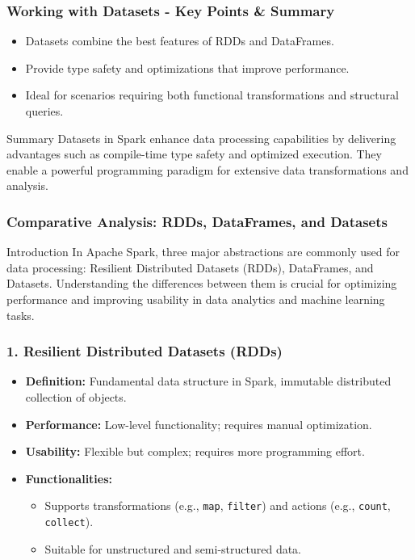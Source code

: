 \documentclass[aspectratio=169]{beamer}
\begin{document}
\begin{frame}[fragile]
    \frametitle{Working with Datasets - Key Points & Summary}
    \begin{itemize}
        \item Datasets combine the best features of RDDs and DataFrames.
        \item Provide type safety and optimizations that improve performance.
        \item Ideal for scenarios requiring both functional transformations and structural queries.
    \end{itemize}
    \begin{block}{Summary}
        Datasets in Spark enhance data processing capabilities by delivering advantages such as compile-time type safety and optimized execution. They enable a powerful programming paradigm for extensive data transformations and analysis.
    \end{block}
\end{frame}

\begin{frame}
    \frametitle{Comparative Analysis: RDDs, DataFrames, and Datasets}
    \begin{block}{Introduction}
        In Apache Spark, three major abstractions are commonly used for data processing: Resilient Distributed Datasets (RDDs), DataFrames, and Datasets. Understanding the differences between them is crucial for optimizing performance and improving usability in data analytics and machine learning tasks.
    \end{block}
\end{frame}

\begin{frame}[fragile]
    \frametitle{1. Resilient Distributed Datasets (RDDs)}
    \begin{itemize}
        \item \textbf{Definition:} Fundamental data structure in Spark, immutable distributed collection of objects.
        \item \textbf{Performance:} Low-level functionality; requires manual optimization.
        \item \textbf{Usability:} Flexible but complex; requires more programming effort.
        \item \textbf{Functionalities:}
            \begin{itemize}
                \item Supports transformations (e.g., \texttt{map}, \texttt{filter}) and actions (e.g., \texttt{count}, \texttt{collect}).
                \item Suitable for unstructured and semi-structured data.
            \end{itemize}
    \end{itemize}
\end{frame}
\end{document}
